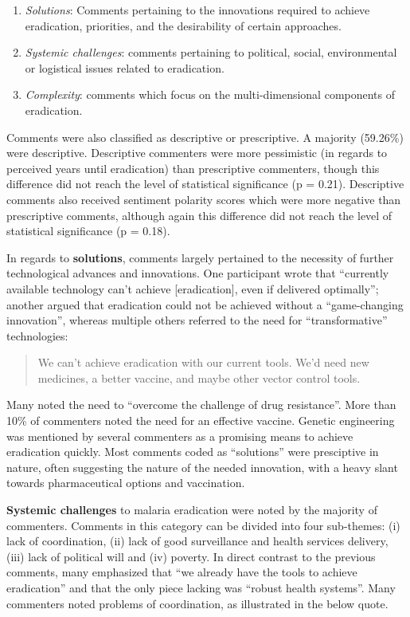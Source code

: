 \documentclass[]{article}
\begin{document}
\begin{enumerate}
\def\labelenumi{\arabic{enumi}.}
\item
  \emph{Solutions}: Comments pertaining to the innovations required to
  achieve eradication, priorities, and the desirability of certain
  approaches.
\item
  \emph{Systemic challenges}: comments pertaining to political, social,
  environmental or logistical issues related to eradication.
\item
  \emph{Complexity}: comments which focus on the multi-dimensional
  components of eradication.
\end{enumerate}

Comments were also classified as descriptive or prescriptive. A majority
(59.26\%) were descriptive. Descriptive commenters were more pessimistic
(in regards to perceived years until eradication) than prescriptive
commenters, though this difference did not reach the level of
statistical significance (p = 0.21). Descriptive comments also received
sentiment polarity scores which were more negative than prescriptive
comments, although again this difference did not reach the level of
statistical significance (p = 0.18).

In regards to \textbf{solutions}, comments largely pertained to the
necessity of further technological advances and innovations. One
participant wrote that ``currently available technology can't achieve
{[}eradication{]}, even if delivered optimally''; another argued that
eradication could not be achieved without a ``game-changing
innovation'', whereas multiple others referred to the need for
``transformative'' technologies:

\begin{quote}
We can't achieve eradication with our current tools. We'd need new medicines, a better vaccine, and maybe other vector control tools.
\end{quote}

Many noted the need to ``overcome the challenge of drug resistance''.
More than 10\% of commenters noted the need for an effective vaccine.
Genetic engineering was mentioned by several commenters as a promising
means to achieve eradication quickly. Most comments coded as
``solutions'' were presciptive in nature, often suggesting the nature of
the needed innovation, with a heavy slant towards pharmaceutical options
and vaccination.

\textbf{Systemic challenges} to malaria eradication were noted by the
majority of commenters. Comments in this category can be divided into
four sub-themes: (i) lack of coordination, (ii) lack of good
surveillance and health services delivery, (iii) lack of political will
and (iv) poverty. In direct contrast to the previous comments, many
emphasized that ``we already have the tools to achieve eradication'' and
that the only piece lacking was ``robust health systems''. Many
commenters noted problems of coordination, as illustrated in the below
quote.
\end{document}
